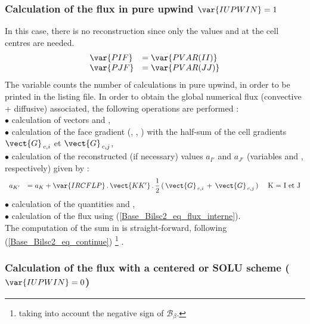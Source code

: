 \subsubsection*{\bf Calculation of the flux in pure upwind $\var{IUPWIN} = 1$}

In this case, there is no reconstruction since only
the values  and  at the cell centres are needed.
\begin{equation}
\begin{array}{ll}
\var{PIF} &= \var{PVAR(II)} \\
\var{PJF} &= \var{PVAR(JJ)} \\
\end{array}
\end{equation}
The variable  counts the number of calculations in pure upwind, 
in order to be printed in the listing file.  
In order to obtain the global numerical flux  (convective + diffusive)
associated, the following operations are performed :\\
$\bullet$ calculation of vectors  and ,\\
$\bullet$ calculation of the face gradient (, , ) with the half-sum of the cell gradients $\vect{G}_{\,c,i}$ et $\vect{G}_{\,c,j}$,\\
$\bullet$ calculation of the reconstructed (if necessary) values $a_{I'}$ and  $a_{J'}$ (variables  and , respectively) given by :
\begin{equation}\label{Base_Bilsc2_Eq_Rec_Dif1}
\begin{array}{lll}
a_{K'}&= a_K +  \var{IRCFLP}\,.\,\vect {KK'}\,.\,\displaystyle\frac{1}{2}\,(\,\vect{G}_{\,c,i}\,+\,\vect{G}_{\,c,j}\,)&\text{ K = I et J}\\
\end{array}
\end{equation}
$\bullet$ calculation of the quantities  and ,\\
$\bullet$ calculation of the flux  using (\ref{Base_Bilsc2_eq_flux_interne}).\\
The computation of the sum in  is straight-forward, following (\ref{Base_Bilsc2_eq_continue})
\footnote{ taking into account the negative sign of $\mathcal{B_{\mathcal{\beta}}}$.} .
\subsubsection*{\bf Calculation of the flux with a centered or SOLU scheme ($\var{IUPWIN} = 0$)}

